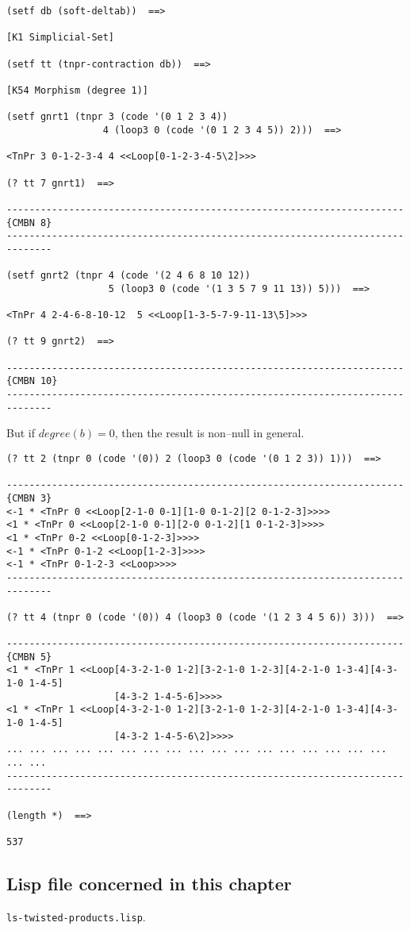 {\footnotesize\begin{verbatim}
(setf db (soft-deltab))  ==>

[K1 Simplicial-Set]

(setf tt (tnpr-contraction db))  ==>

[K54 Morphism (degree 1)]

(setf gnrt1 (tnpr 3 (code '(0 1 2 3 4))
                 4 (loop3 0 (code '(0 1 2 3 4 5)) 2)))  ==>

<TnPr 3 0-1-2-3-4 4 <<Loop[0-1-2-3-4-5\2]>>>

(? tt 7 gnrt1)  ==>

----------------------------------------------------------------------{CMBN 8}
------------------------------------------------------------------------------

(setf gnrt2 (tnpr 4 (code '(2 4 6 8 10 12))
                  5 (loop3 0 (code '(1 3 5 7 9 11 13)) 5)))  ==>

<TnPr 4 2-4-6-8-10-12  5 <<Loop[1-3-5-7-9-11-13\5]>>>

(? tt 9 gnrt2)  ==>

----------------------------------------------------------------------{CMBN 10}
------------------------------------------------------------------------------
\end{verbatim}}
\newpage
But if $degree(b) = 0$, then the result is non--null in general.
{\footnotesize\begin{verbatim}
(? tt 2 (tnpr 0 (code '(0)) 2 (loop3 0 (code '(0 1 2 3)) 1)))  ==>

----------------------------------------------------------------------{CMBN 3}
<-1 * <TnPr 0 <<Loop[2-1-0 0-1][1-0 0-1-2][2 0-1-2-3]>>>>
<1 * <TnPr 0 <<Loop[2-1-0 0-1][2-0 0-1-2][1 0-1-2-3]>>>>
<1 * <TnPr 0-2 <<Loop[0-1-2-3]>>>>
<-1 * <TnPr 0-1-2 <<Loop[1-2-3]>>>>
<-1 * <TnPr 0-1-2-3 <<Loop>>>>
------------------------------------------------------------------------------

(? tt 4 (tnpr 0 (code '(0)) 4 (loop3 0 (code '(1 2 3 4 5 6)) 3)))  ==>

----------------------------------------------------------------------{CMBN 5}
<1 * <TnPr 1 <<Loop[4-3-2-1-0 1-2][3-2-1-0 1-2-3][4-2-1-0 1-3-4][4-3-1-0 1-4-5]
                   [4-3-2 1-4-5-6]>>>>
<1 * <TnPr 1 <<Loop[4-3-2-1-0 1-2][3-2-1-0 1-2-3][4-2-1-0 1-3-4][4-3-1-0 1-4-5]
                   [4-3-2 1-4-5-6\2]>>>>
... ... ... ... ... ... ... ... ... ... ... ... ... ... ... ... ... ... ...
------------------------------------------------------------------------------

(length *)  ==>

537
\end{verbatim}}

\subsection* {Lisp file concerned in this chapter}

{\tt ls-twisted-products.lisp}.
